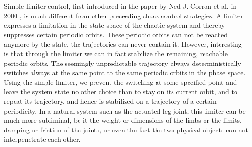 \documentclass[main]{subfiles}
\begin{document}
Simple limiter control, first introduced in the paper by Ned J. Corron et al. in 2000 \cite{bib:Corron2000}, is much different from other preceeding chaos control strategies. A limiter expresses a limitation in the state space of the chaotic system and thereby suppresses certain periodic orbits. These periodic orbits can not be reached anymore by the state, the trajectories can never contain it. However, interesting is that through the limiter we can in fact stabilize the remaining, reachable periodic orbits. The seemingly unpredictable trajectory always deterministically switches always at the same point to the same periodic orbits in the phase space. Using the simple limiter, we prevent the switching at some specified point and leave the system state no other choice than to stay on its current orbit, and to repeat its trajectory, and hence is stabilized on a trajectory of a certain periodicity.
In a natural system such as the actuated leg joint, this limiter can be much more subliminal, be it the weight or dimensions of the limbs or the limits, damping or friction of the joints, or even the fact the two physical objects can not interpenetrate each other.
\end{document}
